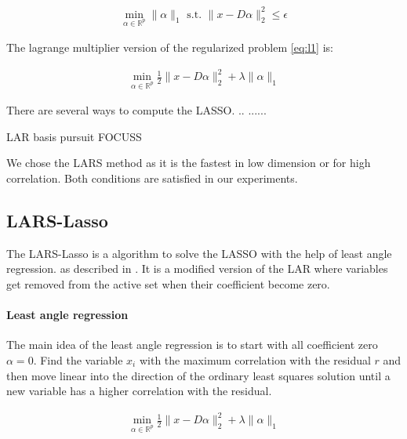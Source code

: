 \begin{align}
\min_{\alpha\in\mathbb{R}^{p}}   \lVert \alpha \rVert_{1}   \textrm{ s.t. } \lVert x - D\alpha \rVert^{2}_{2} \leq \epsilon\label{eq:l1}
\end{align}

The lagrange multiplier version of the regularized problem \ref{eq:l1} is:

\begin{align}
\min_{\alpha\in\mathbb{R}^{p}}  \frac{1}{2} \lVert x - D\alpha \rVert^{2}_{2} + \lambda \lVert \alpha \rVert_{1}
\end{align}

There are several ways to compute the LASSO. .. ...... 

LAR\cite{Efron2004} basis pursuit\cite{Chen1995}  FOCUSS\cite{FOCUSS}

We chose the LARS method as it is the fastest in low dimension or for
high correlation. Both conditions are satisfied in our experiments. 


\subsection {LARS-Lasso}
\label{sec:lars}
The LARS-Lasso is a algorithm to solve the LASSO with the help of least
angle regression. as described in \cite{Efron2004}. It is a modified version of
the LAR where variables get removed from the active set when their coefficient
become zero.

\paragraph{Least angle regression}
The main idea of the least angle regression is to start with all coefficient
zero
$\alpha = 0$. Find the variable $x_i$ with the maximum correlation with the
residual $r$ and then move linear into the direction of the ordinary least
squares solution until a new variable has a higher correlation with the
residual. 


\begin{align}
\min_{\alpha\in\mathbb{R}^{p}}  \frac{1}{2} \lVert x - D\alpha \rVert^{2}_{2} + \lambda \lVert \alpha \rVert_{1}
\end{align}

